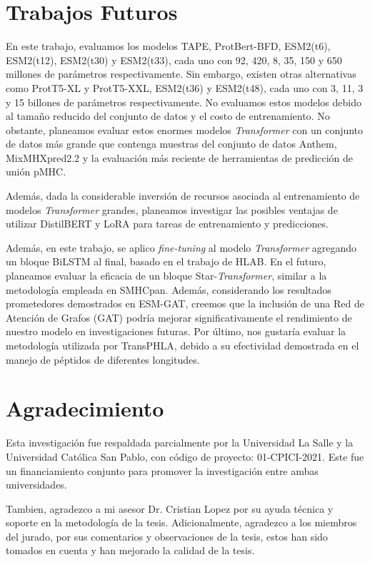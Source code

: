 \section{Trabajos Futuros}
En este trabajo, evaluamos los modelos TAPE, ProtBert-BFD, ESM2(t6), ESM2(t12), ESM2(t30) y ESM2(t33), cada uno con 92, 420, 8, 35, 150 y 650 millones de parámetros respectivamente. Sin embargo, existen otras alternativas como ProtT5-XL y ProtT5-XXL, ESM2(t36) y ESM2(t48), cada uno con 3, 11, 3 y 15 billones de parámetros respectivamente. No evaluamos estos modelos debido al tamaño reducido del conjunto de datos y el costo de entrenamiento. No obstante, planeamos evaluar estos enormes modelos \textit{Transformer} con un conjunto de datos más grande que contenga muestras del conjunto de datos Anthem, MixMHXpred2.2 y la evaluación más reciente de herramientas de predicción de unión pMHC.

Además, dada la considerable inversión de recursos asociada al entrenamiento de modelos \textit{Transformer} grandes, planeamos investigar las posibles ventajas de utilizar DistilBERT y LoRA para tareas de entrenamiento y predicciones.

Además, en este trabajo, se aplico \textit{fine-tuning} al modelo \textit{Transformer} agregando un bloque BiLSTM al final, basado en el trabajo de HLAB. En el futuro, planeamos evaluar la eficacia de un bloque Star-\textit{Transformer}, similar a la metodología empleada en SMHCpan. Además, considerando los resultados prometedores demostrados en ESM-GAT, creemos que la inclusión de una Red de Atención de Grafos (GAT) podría mejorar significativamente el rendimiento de nuestro modelo en investigaciones futuras. Por último, nos gustaría evaluar la metodología utilizada por TransPHLA, debido a su efectividad demostrada en el manejo de péptidos de diferentes longitudes.


\section{Agradecimiento}

Esta investigación fue respaldada parcialmente por la Universidad La Salle y la Universidad Católica San Pablo, con código de proyecto: 01-CPICI-2021. Este fue un financiamiento conjunto para promover la investigación entre ambas universidades. 

Tambien, agradezco a mi asesor Dr. Cristian Lopez por su ayuda técnica y soporte en la metodología de la tesis. Adicionalmente, agradezco a los miembros del jurado, por sus comentarios y observaciones de la tesis, estos han sido tomados en cuenta y han mejorado la calidad de la tesis.








